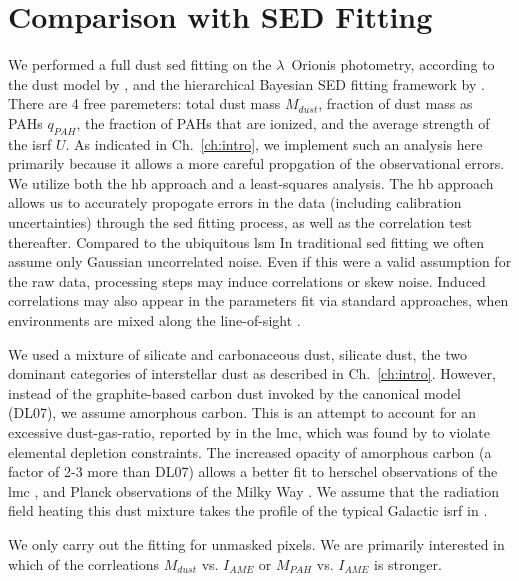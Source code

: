        \section{Comparison with SED Fitting}
          We performed a full dust \acrshort{sed} fitting on the $\lambda$~Orionis photometry, according to the dust model by \cite{galliano11}, and the hierarchical Bayesian SED fitting framework by \cite{galliano18}. There are 4 free paremeters: total dust mass $M_{dust}$, fraction of dust mass as PAHs $q_{PAH}$, the fraction of PAHs that are ionized, and the average strength of the \acrshort{isrf} $U$. As indicated in Ch.~\ref{ch:intro}, we implement such an analysis here primarily because it allows a more careful propgation of the observational errors. We utilize both the \acrlong{hb} approach and a least-squares analysis. The \acrshort{hb} approach allows us to accurately propogate errors in the data (including calibration uncertainties) through the \acrshort{sed} fitting process, as well as the correlation test thereafter. Compared to the ubiquitous \acrlong{lsm} In traditional \acrshort{sed} fitting we often assume only Gaussian uncorrelated noise. Even if this were a valid assumption for the raw data, processing steps may induce correlations or skew noise. Induced correlations may also appear in the parameters fit via standard approaches, when environments are mixed along the line-of-sight \citep{shetty09}.

         We used a mixture of silicate and carbonaceous dust, silicate dust, the two dominant categories of interstellar dust as described in Ch.~\ref{ch:intro}. However, instead of the graphite-based carbon dust invoked by the canonical \cite{draine07} model (DL07), we assume amorphous carbon. This is an attempt to account for an excessive dust-gas-ratio, reported by \cite{israel10, bot10} in the \acrlong{lmc}, which was found by \cite{galliano11} to violate elemental depletion constraints. The increased opacity of amorphous carbon (a factor of 2-3 more than DL07) allows a better fit to \acrshort{herschel} observations of the \acrshort{lmc} \citep{galliano11}, and Planck observations of the Milky Way \citep{planckIntXXIX16}. We assume that the radiation field heating this dust mixture takes the profile of the typical Galactic \acrshort{isrf} in \cite{mathis83}.

          We only carry out the fitting for unmasked pixels. We are primarily interested in which of the corrleations $M_{dust}$ vs. $I_{AME}$ or $M_{PAH}$ vs. $I_{AME}$ is stronger.

